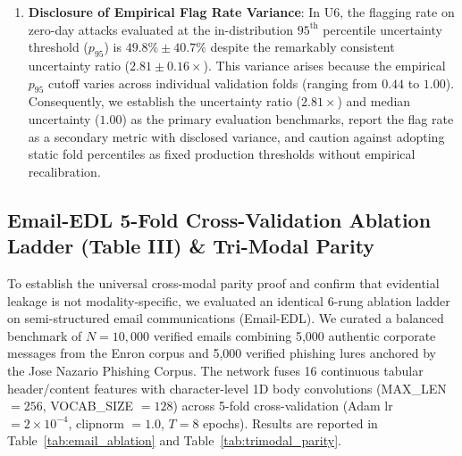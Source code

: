 \documentclass[conference]{IEEEtran}
\begin{document}
\begin{enumerate}
    \item \textbf{Disclosure of Empirical Flag Rate Variance}: In U6, the flagging rate on zero-day attacks evaluated at the in-distribution $95^{\text{th}}$ percentile uncertainty threshold ($p_{95}$) is $49.8\% \pm 40.7\%$ despite the remarkably consistent uncertainty ratio ($2.81 \pm 0.16\times$). This variance arises because the empirical $p_{95}$ cutoff varies across individual validation folds (ranging from $0.44$ to $1.00$). Consequently, we establish the uncertainty ratio ($2.81\times$) and median uncertainty ($1.00$) as the primary evaluation benchmarks, report the flag rate as a secondary metric with disclosed variance, and caution against adopting static fold percentiles as fixed production thresholds without empirical recalibration.
\end{enumerate}

\subsection{Email-EDL 5-Fold Cross-Validation Ablation Ladder (Table III) \& Tri-Modal Parity}
To establish the universal cross-modal parity proof and confirm that evidential leakage is not modality-specific, we evaluated an identical 6-rung ablation ladder on semi-structured email communications (Email-EDL). We curated a balanced benchmark of $N=10,000$ verified emails combining 5,000 authentic corporate messages from the Enron corpus and 5,000 verified phishing lures anchored by the Jose Nazario Phishing Corpus. The network fuses 16 continuous tabular header/content features with character-level 1D body convolutions (MAX\_LEN $= 256$, VOCAB\_SIZE $= 128$) across 5-fold cross-validation (Adam lr $= 2 \times 10^{-4}$, clipnorm $= 1.0$, $T=8$ epochs). Results are reported in Table~\ref{tab:email_ablation} and Table~\ref{tab:trimodal_parity}.
\end{document}
